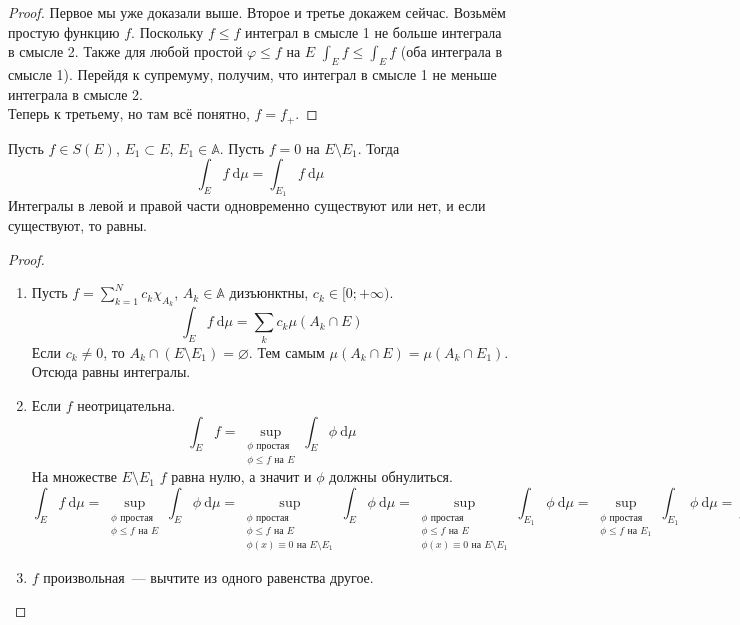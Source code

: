 \documentclass{article}
\begin{document}
    \begin{proof}
        Первое мы уже доказали выше. Второе и третье докажем сейчас. Возьмём простую функцию $f$. Поскольку $f\leqslant f$ интеграл в смысле 1 не больше интеграла в смысле 2. Также для любой простой $\varphi\leqslant f$ на $E$ $\int_E f\leqslant \int_E f$ (оба интеграла в смысле 1). Перейдя к супремуму, получим, что интеграл в смысле 1 не меньше интеграла в смысле 2.\\
        Теперь к третьему, но там всё понятно, $f=f_+$.
    \end{proof}
    \begin{lemma}
        \label{Добавление нулей в интеграл по мере}
        Пусть $f\in S(E)$, $E_1\subset E$, $E_1\in\mathbb A$. Пусть $f=0$ на $E\setminus E_1$. Тогда
        $$
        \int_E f~\mathrm d\mu=\int_{E_1} f~\mathrm d\mu
        $$
        Интегралы в левой и правой части одновременно существуют или нет, и если существуют, то равны.
    \end{lemma}
    \begin{proof}
        \begin{enumerate}
            \item Пусть $f=\sum\limits_{k=1}^Nc_k\chi_{A_k}$, $A_k\in\mathbb A$ дизъюнктны, $c_k\in[0;+\infty)$.
            $$
            \int_E f~\mathrm d\mu=\sum\limits_k c_k\mu(A_k\cap E)
            $$
            Если $c_k\neq0$, то $A_k\cap (E\setminus E_1)=\varnothing$. Тем самым $\mu(A_k\cap E)=\mu(A_k\cap E_1)$. Отсюда равны интегралы.
            \item Если $f$ неотрицательна.
            $$
            \int_E f=\sup\limits_{\substack{\phi\text{ простая}\\\phi\leqslant f\text{ на }E}}\int_E\phi~\mathrm d\mu
            $$
            На множестве $E\setminus E_1$ $f$ равна нулю, а значит и $\phi$ должны обнулиться.
            $$
            \int_E f~\mathrm d\mu=\sup\limits_{\substack{\phi\text{ простая}\\\phi\leqslant f\text{ на }E}}\int_E\phi~\mathrm d\mu=\sup\limits_{\substack{\phi\text{ простая}\\\phi\leqslant f\text{ на }E\\\phi(x)\equiv0\text{ на }E\setminus E_1}}\int_E\phi~\mathrm d\mu=\sup\limits_{\substack{\phi\text{ простая}\\\phi\leqslant f\text{ на }E\\\phi(x)\equiv0\text{ на }E\setminus E_1}}\int_{E_1}\phi~\mathrm d\mu=\sup\limits_{\substack{\phi\text{ простая}\\\phi\leqslant f\text{ на }E_1}}\int_{E_1}\phi~\mathrm d\mu=\int_{E_1}f~\mathrm d\mu
            $$
            \item $f$ произвольная~--- вычтите из одного равенства другое.
        \end{enumerate}
    \end{proof}
\end{document}
